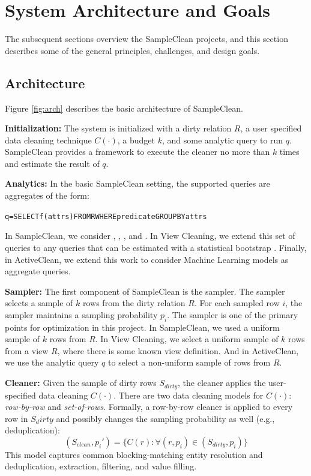 \section{System Architecture and Goals}
The subsequent sections overview the SampleClean projects, and this section describes some of the general principles, challenges, and design goals. 

\subsection{Architecture}
Figure \ref{fig:arch} describes the basic architecture of SampleClean. 

\vspace{0.5em}
\noindent\textbf{Initialization: } The system is initialized with a dirty relation $R$, a user specified data cleaning technique $C(\cdot)$, a budget $k$, and some analytic query to run $q$. SampleClean provides a framework to execute the cleaner no more than $k$ times and estimate the result of $q$.  

\vspace{0.5em}
\noindent\textbf{Analytics: } In the basic SampleClean setting, the supported queries are aggregates of the form:
\begin{alltt}
q = SELECT \textsf{f}(attrs) FROM R WHERE predicate GROUP BY attrs
\end{alltt}
In SampleClean, we consider \avgfunc, \sumfunc, \countfunc, and \varfunc.
In View Cleaning, we extend this set of queries to any queries that can be estimated with a statistical bootstrap \cite{agarwalknowing}.
Finally, in ActiveClean, we extend this work to consider Machine Learning models as aggregate queries.

\vspace{0.5em}
\noindent\textbf{Sampler: } The first component of SampleClean is the sampler. The sampler selects a sample of $k$ rows from the dirty relation $R$. For each sampled row $i$, the sampler maintains a sampling probability $p_i$. The sampler is one of the primary points for optimization in this project. In SampleClean, we used a uniform sample of $k$ rows from $R$.
In View Cleaning, we select a uniform sample of $k$ rows from a view $R$, where there is some known view definition.
And in ActiveClean, we use the analytic query $q$ to select a non-uniform sample of rows from $R$.

\vspace{0.5em}
\noindent\textbf{Cleaner: }
Given the sample of dirty rows $S_{dirty}$,  the cleaner applies the user-specified data cleaning $C(\cdot)$. There are two data cleaning models for $C(\cdot)$: \emph{row-by-row} and \emph{set-of-rows}.
Formally, a row-by-row cleaner is applied to every row in $S_dirty$ and possibly changes the sampling probability as well (e.g., deduplication):
\[
(S_{clean},p_i') = \{C(r) : \forall (r,p_i) \in (S_{dirty},p_i)\}
\]
This model captures common blocking-matching entity resolution and deduplication, extraction, filtering, and value filling.

